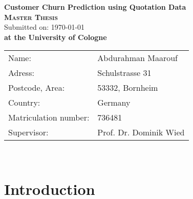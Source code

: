 \documentclass[12pt,titlepage]{article}
\begin{document}
\thispagestyle{empty}

\begin{titlepage}\centering
    \begin{center}
        \vspace*{\fill}
        \huge \textbf{\textsf{Customer Churn Prediction using Quotation Data}}\\
        \vspace{2cm}
        \LARGE\textbf{\textsc{Master Thesis}}\\
        \vspace{1cm}
        \normalsize
        Submitted on: \today \\
        \vspace{2.5cm}
        \large \textbf{at the University of Cologne}
        \vspace{3cm}
    \end{center}
    \normalsize{
        \begin{tabular}{ll}
            Name: & {Abdurahman Maarouf} \\
            Adress: & {Schulstrasse 31} \\
            Postcode, Area: & {53332, Bornheim} \\
            Country: & {Germany} \\
            Matriculation number: & {736481} \\
            Supervisor: & {Prof. Dr. Dominik Wied} \\
        \end{tabular}\\
    }
    \vspace*{\fill}

\end{titlepage}

\thispagestyle{empty}

\tableofcontents

\newpage


\setcounter{page}{1}

\section{Introduction} \par
\end{document}
